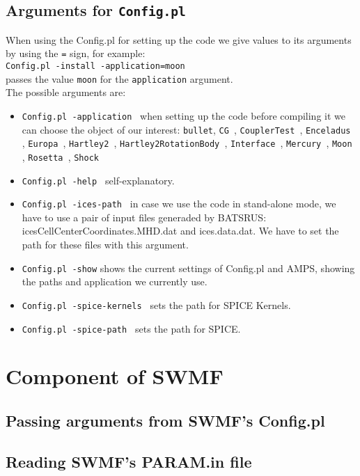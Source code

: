 \subsection{Arguments for {\tt Config.pl}}
When using the Config.pl for setting up the code we give values to its arguments by using the {\tt =} sign, for example:\\
{\tt Config.pl -install -application=moon}\\
passes the value {\tt moon} for the {\tt application} argument.\\
The possible arguments are:
\begin{itemize}
\item {\tt Config.pl -application } when setting up the code before compiling it we can choose the object of our interest: {\tt  bullet}, {\tt CG }, {\tt CouplerTest }, {\tt Enceladus }, {\tt Europa }, {\tt Hartley2 }, {\tt Hartley2RotationBody }, {\tt Interface }, {\tt Mercury }, {\tt Moon }, {\tt Rosetta }, {\tt Shock}\\
\item {\tt Config.pl -help } self-explanatory.\\
\item {\tt Config.pl -ices-path } in case we use the code in stand-alone mode, we have to use a pair of input files generaded by BATSRUS: icesCellCenterCoordinates.MHD.dat and ices.data.dat. We have to set the path for these files with this argument. \\
\item {\tt Config.pl -show} shows the current settings of Config.pl and AMPS, showing the paths and application we currently use.\\
\item {\tt Config.pl -spice-kernels } sets the path for SPICE Kernels.\\
\item {\tt Config.pl -spice-path } sets the path for SPICE.\\
\end{itemize}



\section {Component of SWMF}
\subsection {Passing arguments from SWMF's Config.pl}
\subsection {Reading SWMF's PARAM.in file}
